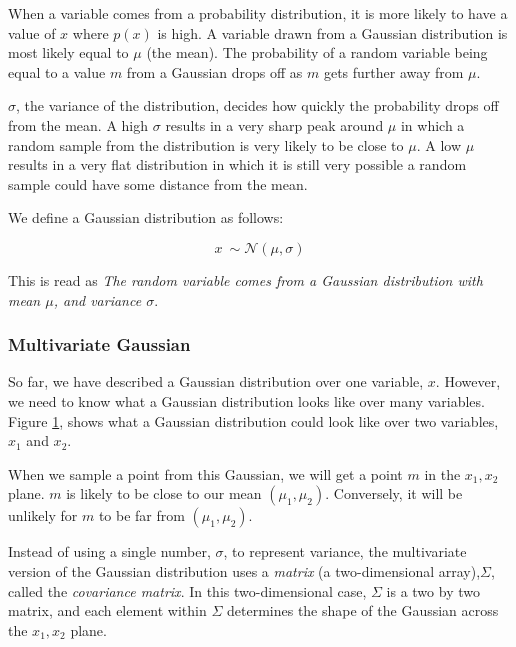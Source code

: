 \documentclass{sig-alternate}
\begin{document}
When a variable comes from a probability distribution, it is more likely to have a value of $x$ where $p(x)$ is high.
A variable drawn from a Gaussian distribution is most likely equal to $\mu$ (the mean).
The probability of a random variable being equal to a value $m$ from a Gaussian drops off as $m$ gets further away from $\mu$.

$\sigma$, the variance of the distribution, decides how quickly the probability drops off from the mean.
A high $\sigma$ results in a very sharp peak around $\mu$ in which a random sample from the distribution is very likely to be close to $\mu$.
A low $\mu$ results in a very flat distribution in which it is still very possible a random sample could have some distance from the mean. 

We define a Gaussian distribution as follows:

\[x ~ \sim \mathcal{N}(\mu, \sigma)\]

This is read as \textit{The random variable comes from a Gaussian distribution with mean $\mu$, and variance $\sigma$}.

\subsubsection{Multivariate Gaussian}

So far, we have described a Gaussian distribution over one variable, $x$.
However, we need to know what a Gaussian distribution looks like over many variables.
Figure \ref{fig:StandardMultivariateGaussian}, shows what a Gaussian distribution could look like over two variables, $x_{1}$ and $x_{2}$.

\begin{figure}[htb]
\centering
{}
\caption{}
\label{fig:StandardMultivariateGaussian}
\end{figure}

When we sample a point from this Gaussian, we will get a point $m$ in the $x_{1},x_{2}$ plane.
$m$ is likely to be close to our mean $(\mu_{1},\mu_{2})$.
Conversely, it will be unlikely for $m$ to be far from $(\mu_{1},\mu_{2})$.

Instead of using a single number, $\sigma$, to represent variance, the multivariate version of the Gaussian distribution uses a \textit{matrix} (a two-dimensional array),$\Sigma$, called the \textit{covariance matrix}.
In this two-dimensional case, $\Sigma$ is a two by two matrix, and each element within $\Sigma$ determines the shape of the Gaussian across the $x_{1},x_{2}$ plane.
\end{document}
